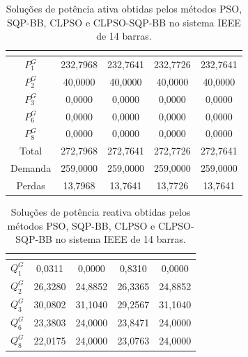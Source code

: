\documentclass[
	12pt,				%
	openany,			%
	twoside,			%
	a4paper,			%
	chapter=TITLE,		%
	section=Title,		%
	subsection=Title,	%
	subsubsection=Title,%
	english,			%
	french,				%
	spanish,			%
	brazil			%
	]{abntex2}
\begin{document}
\begin{ERRATA}
\begin{table}[h!]
\centering
\caption{\label{Pieee14}Soluções de potência ativa obtidas pelos métodos PSO, SQP-BB, CLPSO e CLPSO-SQP-BB no sistema IEEE de 14 barras.}
\begin{tabular}{c c c c c}
	\hline
	\textbf{\makecell{Variável (MW)}} & \textbf{\makecell{PSO}} &
	\textbf{\makecell{SQP-BB}} &
	\textbf{\makecell{CLPSO}} &\textbf{\makecell{CLPSO-SQP-BB}}\\ 
	\hline

 \rule{0mm}{3ex} $P^G_1$& 232,7968 & 232,7641& 232,7726 & 232,7641\\[2mm]
$P^G_2$ & 40,0000 & 40,0000 & 40,0000& 40,0000 \\[2mm]
$P^G_3$ & 0,0000 &0,0000 & 0,0000 & 0,0000 \\[2mm]
$P^G_6$  & 0,0000 &0,0000 & 0,0000& 0,0000 \\[2mm]
$P^G_8$  & 0,0000 &0,0000 & 0,0000& 0,0000 \\[2mm]
Total  & 272,7968 & 272,7641& 272,7726& 272,7641 \\ [2mm]
Demanda & 259,0000 &259,0000 & 259,0000& 259,0000\\[2mm]
Perdas & 13,7968 & 13,7641 & 13,7726& 13,7641 \\[2mm]
\hline
\end{tabular}
\end{table}


\begin{table}[h!]
\centering
\caption{\label{Qieee14}Soluções de potência reativa obtidas pelos métodos PSO, SQP-BB, CLPSO e CLPSO-SQP-BB no sistema IEEE de 14 barras.}
\begin{tabular}{c c c c c}
	\hline
	\textbf{\makecell{Variável (MVAr)}} & \textbf{\makecell{PSO}} &
	\textbf{\makecell{SQP-BB}} &
	\textbf{\makecell{CLPSO}} &\textbf{\makecell{CLPSO-SQP-BB}}\\ 
	\hline

 \rule{0mm}{3ex}
$Q^G_1 $ & 0,0311& 0,0000 &0,8310 & 0,0000 \\[2mm]
$Q^G_2$ &26,3280& 24,8852& 26,3365& 24,8852\\[2mm]
$Q^G_3$ &30,0802 & 31,1040& 29,2567	& 31,1040 \\[2mm]
$Q^G_6 $ & 23,3803& 24,0000& 23,8471& 24,0000 \\[2mm]
$Q^G_8$ &22,0175& 24,0000& 23,0763& 24,0000\\[2mm]
\hline
\end{tabular}
\end{table}



\end{ERRATA}
\end{document}
